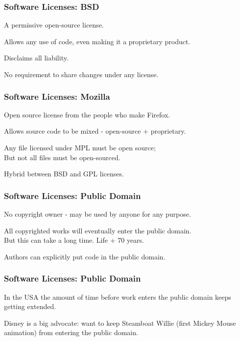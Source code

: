 \begin{frame}
\frametitle{Software Licenses: BSD}

\begin{changemargin}{1cm}
A permissive open-source license.

Allows any use of code, even making it a proprietary product.

Disclaims all liability.

No requirement to share changes under any license.

\end{changemargin}
\end{frame}

\begin{frame}
\frametitle{Software Licenses: Mozilla}

\begin{changemargin}{1cm}
Open source license from the people who make Firefox.

Allows source code to be mixed - open-source + proprietary.

Any file licensed under MPL must be open source;\\
\quad But not all files must be open-sourced.

Hybrid between BSD and GPL licenses.

\end{changemargin}
\end{frame}

\begin{frame}
\frametitle{Software Licenses: Public Domain}

\begin{changemargin}{1cm}
No copyright owner - may be used by anyone for any purpose.

All copyrighted works will eventually enter the public domain.\\
\quad\quad But this can take a long time. Life + 70 years.

Authors can explicitly put code in the public domain.

\end{changemargin}
\end{frame}

\begin{frame}
\frametitle{Software Licenses: Public Domain}

\begin{changemargin}{1cm}
In the USA the amount of time before work enters the public domain keeps getting extended.

Disney is a big advocate: want to keep Steamboat Willie (first Mickey Mouse animation) from entering the public domain.

\end{changemargin}
\end{frame}

